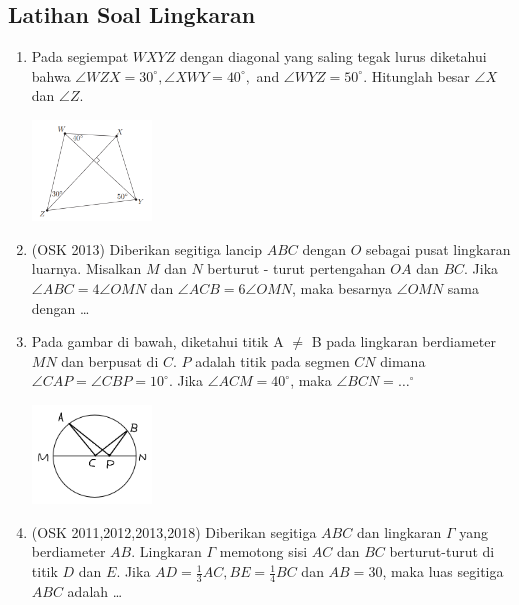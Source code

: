 \subsection{Latihan Soal Lingkaran}
\begin{enumerate}
    \item Pada segiempat $WXYZ$ dengan diagonal yang saling tegak lurus diketahui bahwa $\angle WZX = 30^\circ, \angle XWY = 40^\circ,$ and $\angle WYZ = 50^\circ$. Hitunglah besar $\angle X$ dan $\angle Z$.
    \begin{center}
        \includegraphics[width=0.25\textwidth]{Soal/Geometry/evanquad.PNG}
    \end{center}
		
    \item (OSK 2013) Diberikan segitiga lancip $ABC$ dengan $O$ sebagai pusat lingkaran luarnya. Misalkan $M$ dan $N$ berturut - turut pertengahan $OA$ dan $BC$. Jika $\angle ABC = 4\angle OMN$ dan $\angle ACB = 6\angle OMN$, maka besarnya $\angle OMN$ sama dengan \dots

    \item 	Pada gambar di bawah, diketahui titik A $\ne$ B pada lingkaran berdiameter $MN$ dan berpusat di $C$. $P$ adalah titik pada segmen $CN$ dimana $\angle CAP = \angle CBP = 10 ^\circ$. Jika $\angle ACM = 40^\circ$, maka $\angle BCN = \dots^\circ$	
    \begin{center}
         \includegraphics[width=0.25\textwidth]{Soal/Geometry/soalLingkaran1.PNG}
    \end{center}

    \item (OSK 2011,2012,2013,2018) Diberikan segitiga $ABC$ dan lingkaran $\Gamma$ yang berdiameter $AB$. Lingkaran $\Gamma$ memotong sisi $AC$ dan $BC$ berturut-turut di titik $D$ dan $E$. Jika $AD = \frac13 AC, BE =\frac14 BC$ dan $AB = 30$, maka luas segitiga $ABC$ adalah \dots
\end{enumerate}